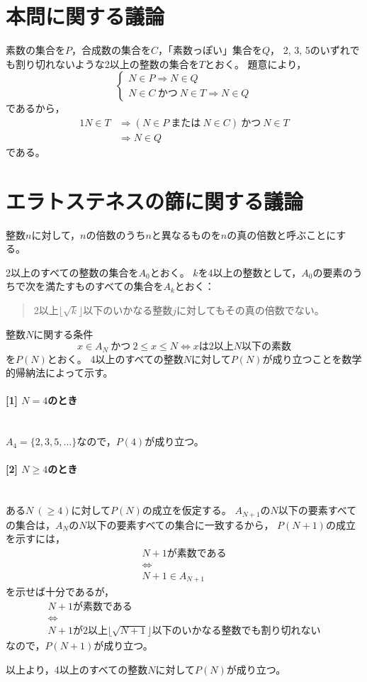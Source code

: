 \documentclass{article}
\newcommand{\myparagraph}[1]{\paragraph{#1}\mbox{}\\}
\begin{document}
\section{本問に関する議論}

素数の集合を$P$，合成数の集合を$C$，「素数っぽい」集合を$Q$，
2, 3, 5のいずれでも割り切れないような2以上の整数の集合を$T$とおく。
題意により，
\begin{equation}
    \begin{cases}
        N \in P \Longrightarrow N \in Q \\
        N \in C\ \mbox{かつ}\ N \in T \Longrightarrow N \in Q
    \end{cases}
\end{equation}
であるから，
\begin{alignat}{1}
    N \in T &\Longrightarrow (N \in P\ \mbox{または}\ N \in C)\ \mbox{かつ}\ N \in T \\
    &\Longrightarrow N \in Q
\end{alignat}
である。

\section{エラトステネスの篩に関する議論}

整数$n$に対して，$n$の倍数のうち$n$と異なるものを$n$の真の倍数と呼ぶことにする。

2以上のすべての整数の集合を$A_0$とおく。
$k$を4以上の整数として，$A_0$の要素のうちで次を満たすものすべての集合を$A_k$とおく：
\begin{quote}
    2以上$\lfloor \sqrt{k} \rfloor$以下のいかなる整数$j$に対してもその真の倍数でない。
\end{quote}

整数$N$に関する条件
\begin{equation}
    x \in A_N\ \mbox{かつ}\ 2 \leq x \leq N
    \Longleftrightarrow
    \mbox{$x$は2以上$N$以下の素数}
\end{equation}
を$P(N)$とおく。
4以上のすべての整数$N$に対して$P(N)$が成り立つことを数学的帰納法によって示す。

\myparagraph{[1] $N = 4$のとき}

$A_4 = \{2, 3, 5, \ldots \}$なので，$P(4)$が成り立つ。

\myparagraph{[2] $N \geq 4$のとき}

ある$N\ (\geq 4)$に対して$P(N)$の成立を仮定する。
$A_{N + 1}$の$N$以下の要素すべての集合は，$A_N$の$N$以下の要素すべての集合に一致するから，
$P(N + 1)$の成立を示すには，
\begin{gather}
    \mbox{$N + 1$が素数である} \\
    \Longleftrightarrow \\
    N + 1 \in A_{N + 1}
\end{gather}
を示せば十分であるが，
\begin{gather}
    \mbox{$N + 1$が素数である} \\
    \Longleftrightarrow \\
    \mbox{$N + 1$が2以上$\lfloor \sqrt{N + 1} \rfloor$以下のいかなる整数でも割り切れない}
\end{gather}
なので，$P(N + 1)$が成り立つ。

以上より，4以上のすべての整数$N$に対して$P(N)$が成り立つ。
\end{document}
